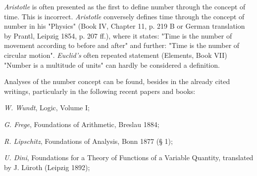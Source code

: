 {\textit{Aristotle} is often presented as the first to define number through the concept of time. This is incorrect. \textit{Aristotle} conversely defines time through the concept of number in his "Physics" (Book IV, Chapter 11, p. 219 B or German translation by Prantl, Leipzig 1854, p. 207 ff.), where it states: "Time is the number of movement according to before and after" and further: "Time is the number of circular motion". \textit{Euclid's} often repeated statement (Elements, Book VII) "Number is a multitude of units" can hardly be considered a definition.

Analyses of the number concept can be found, besides in the already cited writings, particularly in the following recent papers and books:

\textit{W. Wundt}, Logic, Volume I;

\textit{G. Frege}, Foundations of Arithmetic, Breslau 1884;

\textit{R. Lipschitz}, Foundations of Analysis, Bonn 1877 (§ 1);

\textit{U. Dini}, Foundations for a Theory of Functions of a Variable Quantity, translated by J. Lüroth (Leipzig 1892);

}
